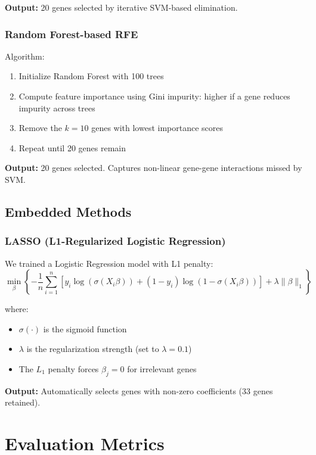\textbf{Output:} 20 genes selected by iterative SVM-based elimination.

\subsubsection{Random Forest-based RFE}

Algorithm:
\begin{enumerate}
    \item Initialize Random Forest with 100 trees
    \item Compute feature importance using Gini impurity: higher if a gene reduces impurity across trees
    \item Remove the $k=10$ genes with lowest importance scores
    \item Repeat until 20 genes remain
\end{enumerate}

\textbf{Output:} 20 genes selected. Captures non-linear gene-gene interactions missed by SVM.

\subsection{Embedded Methods}

\subsubsection{LASSO (L1-Regularized Logistic Regression)}

We trained a Logistic Regression model with L1 penalty:
\begin{equation}
    \min_{\beta} \left\{ -\frac{1}{n}\sum_{i=1}^{n} \left[y_i \log(\sigma(X_i \beta)) + (1-y_i) \log(1 - \sigma(X_i \beta))\right] + \lambda \|\beta\|_1 \right\}
\end{equation}

where:
\begin{itemize}
    \item $\sigma(\cdot)$ is the sigmoid function
    \item $\lambda$ is the regularization strength (set to $\lambda = 0.1$)
    \item The $L_1$ penalty forces $\beta_j = 0$ for irrelevant genes
\end{itemize}

\textbf{Output:} Automatically selects genes with non-zero coefficients (33 genes retained).

\section{Evaluation Metrics}

